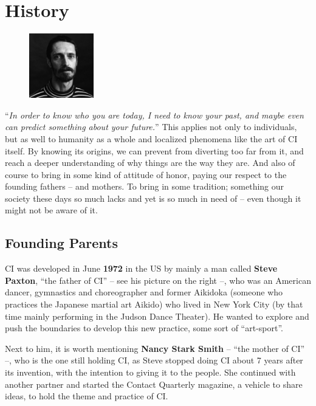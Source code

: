 \chapter{History}\label{ch:history}

\begin{figure}
\centering
\includegraphics[width=0.25\textwidth]{images/history}
\end{figure}

``\textit{In order to know who you are today, I need to know your past, and maybe even can predict something about your future.}''
This applies not only to individuals, but as well to humanity as a whole and localized phenomena like the art of CI itself.
By knowing its origins, we can prevent from diverting too far from it, and reach a deeper understanding of why things are the way they are.
And also of course to bring in some kind of attitude of honor, paying our respect to the founding fathers -- and mothers.
To bring in some tradition; something our society these days so much lacks and yet is so much in need of -- even though it might not be aware of it.

\section{Founding Parents}\label{sec:founding-parents}

CI was developed in June \textbf{1972} in the US by mainly a man called \textbf{Steve Paxton}, ``the father of CI'' -- see his picture on the right --, who was an American dancer, gymnastics and choreographer and former Aikidoka (someone who practices the Japanese martial art Aikido) who lived in New York City (by that time mainly performing in the Judson Dance Theater).
He wanted to explore and push the boundaries to develop this new practice, some sort of ``art-sport''.

Next to him, it is worth mentioning \textbf{Nancy Stark Smith} -- ``the mother of CI'' --, who is the one still holding CI, as Steve stopped doing CI about 7 years after its invention, with the intention to giving it to the people.
She continued with another partner and started the Contact Quarterly magazine, a vehicle to share ideas, to hold the theme and practice of CI\@.

